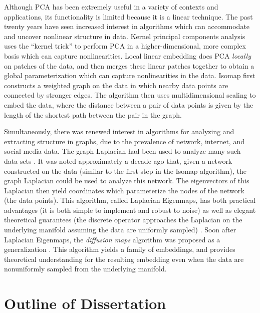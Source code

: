 Although PCA has been extremely useful in a variety of contexts and applications, its functionality is limited because it is a linear technique. 
%
The past twenty years have seen increased interest in algorithms which can accommodate and uncover nonlinear structure in data.
%
Kernel principal components analysis \cite{scholkopf1997kernel} uses the ``kernel trick'' to perform PCA in a higher-dimensional, more complex basis which can capture nonlinearities. 
%
Local linear embedding \cite{roweis2000nonlinear} does PCA {\em locally} on patches of the data, and then merges these linear patches together to obtain a global parameterization which can capture nonlinearities in the data. 
%
Isomap \cite{tenenbaum2000global} first constructs a weighted graph on the data in which nearby data points are connected by stronger edges.
%
The algorithm then uses multidimensional scaling \cite{joseph1978multidimensional} to embed the data, where the distance between a pair of data points is given by the length of the shortest path between the pair in the graph. 

Simultaneously, there was renewed interest in algorithms for analyzing and extracting structure in graphs, due to the prevalence of network, internet, and social media data. 
%
The graph Laplacian had been used to analyze many such data sets \cite{shi2000normalized, ng2002spectral}. 
%
It was noted approximately a decade ago that, given a network constructed on the data (similar to the first step in the Isomap algorithm), the graph Laplacian could be used to analyze this network. 
%
The eigenvectors of this Laplacian then yield coordinates which parameterize the nodes of the network (the data points). 
%
This algorithm, called Laplacian Eigenmaps, has both practical advantages (it is both simple to implement and robust to noise) as well as elegant theoretical guarantees (the discrete operator approaches the Laplacian on the underlying manifold assuming the data are uniformly sampled) \cite{Belkin2003}. 
%
Soon after Laplacian Eigenmaps, the {\em diffusion maps} algorithm was proposed as a generalization \cite{coifman2005geometric, coifman2006geometric}. 
%
This algorithm yields a family of embeddings, and provides theoretical understanding for the resulting embedding even when the data are nonuniformly sampled from the underlying manifold. 


\section{Outline of Dissertation}

